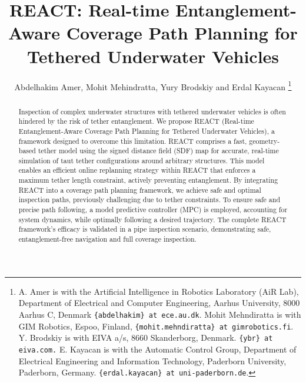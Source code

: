 \documentclass[letterpaper, 10 pt, conference]{ieeetran}  %
\begin{document}
%
\title{REACT: Real-time Entanglement-Aware Coverage Path Planning for Tethered Underwater Vehicles}

\author{Abdelhakim Amer, Mohit Mehindratta, Yury Brodskiy and Erdal Kayacan
\thanks{A. Amer is with the Artificial Intelligence in Robotics Laboratory (AiR Lab), Department of Electrical and Computer Engineering, Aarhus University, 8000 Aarhus C, Denmark {\tt\small \{abdelhakim\} at ece.au.dk}.    Mohit Mehndiratta is with GIM Robotics, Espoo, Finland, {\tt\small \{mohit.mehndiratta\} at gimrobotics.fi}.
     Y. Brodskiy is with EIVA a/s, 8660 Skanderborg, Denmark. {\tt\small \{ybr\} at eiva.com.}
    E. Kayacan is with the Automatic Control Group, Department of Electrical Engineering and Information Technology, Paderborn University, Paderborn, Germany. {\tt\small \{erdal.kayacan\} at uni-paderborn.de}.}%
}

\maketitle
\begin{abstract}

Inspection of complex underwater structures with tethered underwater vehicles is often hindered by the risk of tether entanglement. We propose REACT (Real-time Entanglement-Aware Coverage Path Planning for Tethered Underwater Vehicles), a framework designed to overcome this limitation. REACT comprises a fast, geometry-based tether model using the signed distance field (SDF) map for accurate, real-time simulation of taut tether configurations around arbitrary structures. This model enables an efficient online replanning strategy within REACT that enforces a maximum tether length constraint, actively preventing entanglement. By integrating REACT into a coverage path planning framework, we achieve safe and optimal inspection paths, previously challenging due to tether constraints. To ensure safe and precise path following, a model predictive controller (MPC) is employed, accounting for system dynamics, while optimally following a desired trajectory. The complete REACT framework's efficacy is validated in a pipe inspection scenario, demonstrating safe, entanglement-free navigation and full coverage inspection.









\end{abstract}
\end{document}
